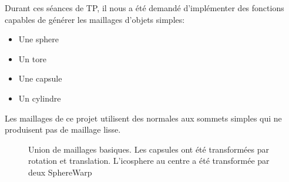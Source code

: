 Durant ces séances de TP, il nous a été demandé d'implémenter des fonctions capables de générer les maillages d'objets simples:

\begin {itemize}
	\item {Une sphere}
	\item {Un tore}
	\item {Une capsule}
	\item {Un cylindre}
\end {itemize}

Les maillages de ce projet utilisent des normales aux sommets simples qui ne produisent pas de maillage lisse.

\begin{figure}[h!]

	\caption{Union de maillages basiques. Les capsules ont été transformées par rotation et translation. L'icosphere au centre a été transformée par deux SphereWarp}
\end{figure}
\FloatBarrier
